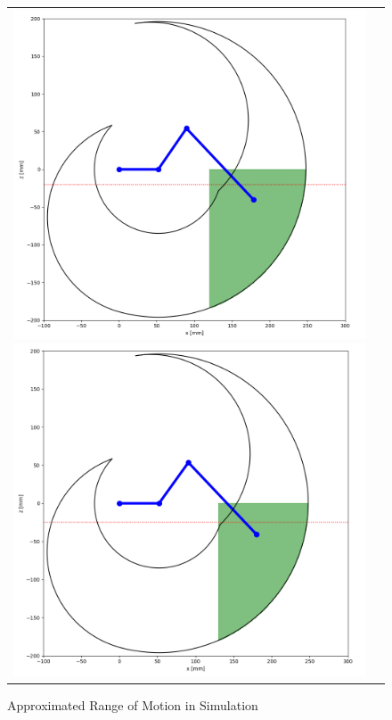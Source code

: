 \newpage

\begin{figure}[h]
  \begin{tabular}{cc}
      \begin{minipage}{0.45\textwidth}
          \centering
          \includegraphics[width=1.0\linewidth]{figure/chapter2/leg_range_120_20.png}
          \caption{Approximated \newline Range of Motion in Simulation \newline}
          \label{fig:simu_leg_range} %
      \end{minipage}
      \begin{minipage}{0.45\textwidth}
          \centering
          \includegraphics[width=1.0\linewidth]{figure/chapter2/leg_range_130_25.png}

\end{minipage}
\end{tabular}
\end{figure}
